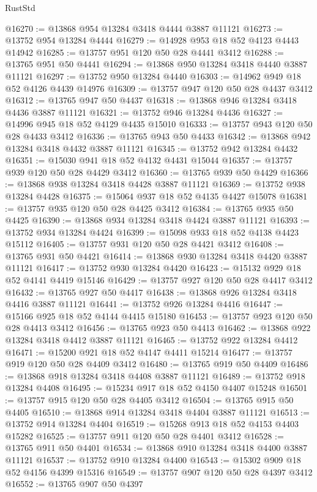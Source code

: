 \begin{lexlean}{RustStd}
\begin{coremodule}
@16270 := @13868 @954 @13284 @3418 @4444 @3887 @11121
@16273 := @13752 @954 @13284 @4444
@16279 := @14928 @953 @18 @52 @4123 @4443 @14942
@16285 := @13757 @951 @120 @50 @28 @4441 @3412
@16288 := @13765 @951 @50 @4441
@16294 := @13868 @950 @13284 @3418 @4440 @3887 @11121
@16297 := @13752 @950 @13284 @4440
@16303 := @14962 @949 @18 @52 @4126 @4439 @14976
@16309 := @13757 @947 @120 @50 @28 @4437 @3412
@16312 := @13765 @947 @50 @4437
@16318 := @13868 @946 @13284 @3418 @4436 @3887 @11121
@16321 := @13752 @946 @13284 @4436
@16327 := @14996 @945 @18 @52 @4129 @4435 @15010
@16333 := @13757 @943 @120 @50 @28 @4433 @3412
@16336 := @13765 @943 @50 @4433
@16342 := @13868 @942 @13284 @3418 @4432 @3887 @11121
@16345 := @13752 @942 @13284 @4432
@16351 := @15030 @941 @18 @52 @4132 @4431 @15044
@16357 := @13757 @939 @120 @50 @28 @4429 @3412
@16360 := @13765 @939 @50 @4429
@16366 := @13868 @938 @13284 @3418 @4428 @3887 @11121
@16369 := @13752 @938 @13284 @4428
@16375 := @15064 @937 @18 @52 @4135 @4427 @15078
@16381 := @13757 @935 @120 @50 @28 @4425 @3412
@16384 := @13765 @935 @50 @4425
@16390 := @13868 @934 @13284 @3418 @4424 @3887 @11121
@16393 := @13752 @934 @13284 @4424
@16399 := @15098 @933 @18 @52 @4138 @4423 @15112
@16405 := @13757 @931 @120 @50 @28 @4421 @3412
@16408 := @13765 @931 @50 @4421
@16414 := @13868 @930 @13284 @3418 @4420 @3887 @11121
@16417 := @13752 @930 @13284 @4420
@16423 := @15132 @929 @18 @52 @4141 @4419 @15146
@16429 := @13757 @927 @120 @50 @28 @4417 @3412
@16432 := @13765 @927 @50 @4417
@16438 := @13868 @926 @13284 @3418 @4416 @3887 @11121
@16441 := @13752 @926 @13284 @4416
@16447 := @15166 @925 @18 @52 @4144 @4415 @15180
@16453 := @13757 @923 @120 @50 @28 @4413 @3412
@16456 := @13765 @923 @50 @4413
@16462 := @13868 @922 @13284 @3418 @4412 @3887 @11121
@16465 := @13752 @922 @13284 @4412
@16471 := @15200 @921 @18 @52 @4147 @4411 @15214
@16477 := @13757 @919 @120 @50 @28 @4409 @3412
@16480 := @13765 @919 @50 @4409
@16486 := @13868 @918 @13284 @3418 @4408 @3887 @11121
@16489 := @13752 @918 @13284 @4408
@16495 := @15234 @917 @18 @52 @4150 @4407 @15248
@16501 := @13757 @915 @120 @50 @28 @4405 @3412
@16504 := @13765 @915 @50 @4405
@16510 := @13868 @914 @13284 @3418 @4404 @3887 @11121
@16513 := @13752 @914 @13284 @4404
@16519 := @15268 @913 @18 @52 @4153 @4403 @15282
@16525 := @13757 @911 @120 @50 @28 @4401 @3412
@16528 := @13765 @911 @50 @4401
@16534 := @13868 @910 @13284 @3418 @4400 @3887 @11121
@16537 := @13752 @910 @13284 @4400
@16543 := @15302 @909 @18 @52 @4156 @4399 @15316
@16549 := @13757 @907 @120 @50 @28 @4397 @3412
@16552 := @13765 @907 @50 @4397

\end{coremodule}
\end{lexlean}
